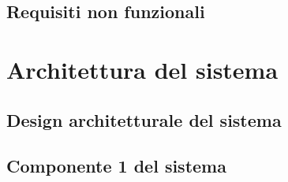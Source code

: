 \subsection{Requisiti non funzionali}


\section{Architettura del sistema}


\subsection{Design architetturale del sistema}


\subsection{Componente 1 del sistema}

